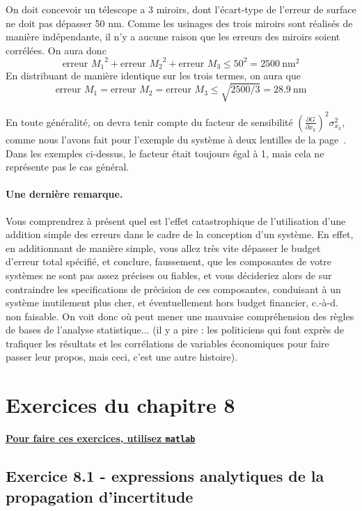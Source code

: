 On doit concevoir un télescope a 3 miroirs, dont l'écart-type de l'erreur de surface ne doit pas dépasser 50 nm. Comme les usinages des trois miroirs sont réalisés de manière indépendante, il n'y a aucune raison que les erreurs des miroirs soient corrélées. On aura donc
$$
\text{erreur $M_1$}^2+\text{erreur $M_2$}^2+\text{erreur $M_3$}\le 50^2=2500\ \text{nm}^2
$$
En distribuant de manière identique sur les trois termes, on aura que
$$
\text{erreur $M_1$}=\text{erreur $M_2$}=\text{erreur $M_3$}\le \sqrt{2500/3}=28.9\ \text{nm}
$$

En toute généralité, on devra tenir compte du facteur de sensibilité $\left(\frac{\partial G}{\partial x_k}\right)^2\sigma_{x_k}^2$, comme nous l'avons fait pour l'exemple du système à deux lentilles de la page~\pageref{sec:exopt}. Dans les exemples ci-dessus, le facteur était toujours égal à 1, mais cela ne représente pas le cas général.

\paragraph{Une dernière remarque.} Vous comprendrez à présent quel est l'effet catastrophique de l'utilisation d'une addition simple des erreurs dans le cadre de la conception d'un système. En effet, en additionnant de manière simple, vous allez très vite dépasser le budget d'erreur total spécifié, et conclure, faussement, que les composantes de votre systèmes ne sont pas assez précises ou fiables, et vous décideriez alors de sur contraindre les specifications de précision de ces composantes, conduisant à un système inutilement plus cher, et éventuellement hors budget financier, c.-à-d. non faisable. On voit donc où peut mener une mauvaise compréhension des règles de bases de l'analyse statistique... (il y a pire : les politiciens qui font exprès de trafiquer les résultats et les corrélations de variables économiques pour faire passer leur propos, mais ceci, c'est une autre histoire).

\section{Exercices du chapitre 8}

\begin{center}
\Large \bf {\underline{Pour faire ces exercices, utilisez \texttt{matlab}}}
\end{center}

\subsection*{Exercice 8.1 - expressions analytiques de la propagation d'incertitude}

